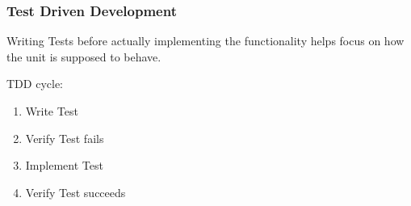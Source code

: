 \begin{frame}
    \frametitle{Test Driven Development}
    Writing Tests before actually implementing the functionality helps focus on
    how the unit is supposed to behave.

    TDD cycle:
    \begin{enumerate}
        \item{Write Test}
        \item{Verify Test fails}
        \item{Implement Test}
        \item{Verify Test succeeds}
    \end{enumerate}
\end{frame}
